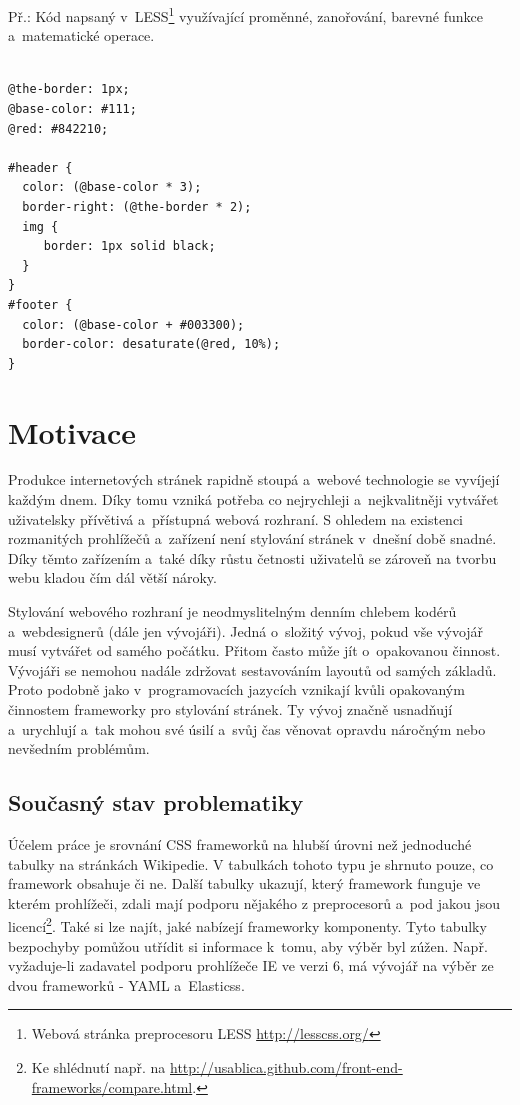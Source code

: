 \documentclass[thesis=B,czech]{FITthesis}[2012/06/26]
\begin{document}
\noindent Př.: Kód napsaný v~LESS\footnote{Webová stránka preprocesoru LESS \url{http://lesscss.org/}} využívající proměnné, zanořování, barevné funkce a~matematické operace.
\scriptsize
\begin{verbatim}

@the-border: 1px;
@base-color: #111;
@red: #842210;

#header {
  color: (@base-color * 3);
  border-right: (@the-border * 2);
  img {
     border: 1px solid black;  
  }
}
#footer {
  color: (@base-color + #003300);
  border-color: desaturate(@red, 10%);
}
\end{verbatim}
\normalsize

\chapter{Motivace}
Produkce internetových stránek rapidně stoupá a~webové technologie se vyvíjejí každým dnem. Díky tomu vzniká potřeba co nejrychleji a~nejkvalitněji vytvářet uživatelsky přívětivá a~přístupná webová rozhraní. S ohledem na existenci rozmanitých prohlížečů a~zařízení není stylování stránek v~dnešní době snadné. Díky těmto zařízením a~také díky růstu četnosti uživatelů se zároveň na tvorbu webu kladou čím dál větší nároky.

Stylování webového rozhraní je neodmyslitelným denním chlebem kodérů a~webdesignerů (dále jen vývojáři). Jedná o~složitý vývoj, pokud vše vývojář musí vytvářet od samého počátku. Přitom často může jít o~opakovanou činnost. Vývojáři se nemohou nadále zdržovat sestavováním layoutů od samých základů. Proto podobně jako v~programovacích jazycích vznikají kvůli opakovaným činnostem frameworky pro stylování stránek. Ty vývoj značně usnadňují a~urychlují a~tak mohou své úsilí a~svůj čas věnovat opravdu náročným nebo nevšedním problémům.


\section{Současný stav problematiky}

Účelem práce je srovnání \gls{CSS} frameworků na hlubší úrovni než jednoduché tabulky na stránkách Wikipedie. V tabulkách tohoto typu je shrnuto pouze, co framework obsahuje či ne. Další tabulky ukazují, který framework funguje ve kterém prohlížeči, zdali mají podporu nějakého z preprocesorů a~pod jakou jsou licencí\footnote{Ke shlédnutí např. na \url{http://usablica.github.com/front-end-frameworks/compare.html}.}. Také si lze najít, jaké nabízejí frameworky komponenty. Tyto tabulky bezpochyby pomůžou utřídit si informace k~tomu, aby výběr byl zúžen. Např. vyžaduje-li zadavatel podporu prohlížeče \gls{IE} ve verzi 6, má vývojář na výběr ze dvou frameworků - \gls{YAML} a~Elasticss.
\end{document}
